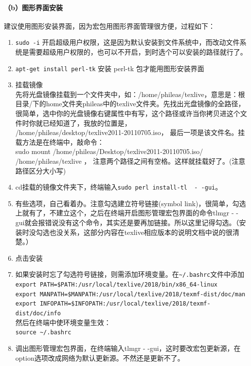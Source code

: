 \paragraph{（b）图形界面安装}
建议使用图形安装界面，因为宏包用图形界面管理很方便，过程如下：
\begin{enumerate}
\item \verb*|sudo -i| 开启超级用户权限，这是因为默认安装到文件系统中，而改动文件系统是需要超级用户权限的，也可以不开启，到时选个可以安装的路径就行了。
\item  \verb*|apt-get install perl-tk| 安装 perl-tk 包才能用图形安装界面
\item 挂载镜像\\
先将光盘镜像挂载到一个文件夹中，如：/home/phileas/texlive，意思是：根目录/下的home文件夹phileas中的texlive文件夹。先找出光盘镜像的全路径，很简单，选中你的光盘镜像右键属性中有写，这个路径或许当你拷贝进这个文件时你就已经知道了，我放的位置是，\\
/home/phileas/desktop/texlive2011-20110705.iso，
最后一项是该文件名。挂载方法是在终端中，敲命令：\\
sudo mount /home/phileas/Desktop/texlive2011-20110705.iso/~~ /home/phileas/texlive ，
注意两个路径之间有空格。这样就挂载好了。(注意路径区分大小写)
\item cd挂载的镜像文件夹下，终端输入\verb|sudo perl install-tl  - -gui|。
\item 有些选项，自己看着办。注意勾选建立符号链接(symbol link)，很简单，勾选上就有了，不建立这个，之后在终端开启图形管理宏包界面的命令tlmgr - - gui就会报错说没有这个命令，其实还是要再加链接。所以这里记得勾选。（安装时没勾选也没关系，这部分内容在texlive相应版本的说明文档中说的很清楚。）
\item 点击安装

\item 如果安装时忘了勾选符号链接，则需添加环境变量。在\verb|~/.bashrc|文件中添加\\
\verb|export PATH=$PATH:/usr/local/texlive/2018/bin/x86_64-linux|\\
\verb|export MANPATH=$MANPATH:/usr/local/texlive/2018/texmf-dist/doc/man|\\
\verb|export INFOPATH=$INFOPATH:/usr/local/texlive/2018/texmf-dist/doc/info|\\
然后在终端中使环境变量生效：\\
\verb|source ~/.bashrc|

\item 调出图形管理宏包界面，在终端输入tlmgr - -gui，这时要改宏包更新源，在option选项改成网络为默认更新源。不然还是更新不了。
\end{enumerate}


